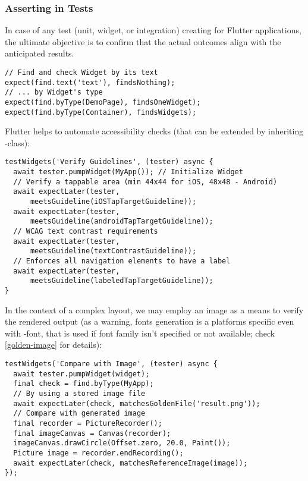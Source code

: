 \newpage
\subsubsection{Asserting in Tests}

In case of any test (unit, widget, or integration) creating for Flutter applications, the ultimate objective is to 
confirm that the actual outcomes align with the anticipated results.

\begin{lstlisting}
// Find and check Widget by its text
expect(find.text('text'), findsNothing);
// ... by Widget's type
expect(find.byType(DemoPage), findsOneWidget);
expect(find.byType(Container), findsWidgets);
\end{lstlisting}

\noindent Flutter helps to automate accessibility checks (that can be extended by inheriting 
-class):

\begin{lstlisting}
testWidgets('Verify Guidelines', (tester) async {
  await tester.pumpWidget(MyApp()); // Initialize Widget
  // Verify a tappable area (min 44x44 for iOS, 48x48 - Android)
  await expectLater(tester, 
      meetsGuideline(iOSTapTargetGuideline));
  await expectLater(tester, 
      meetsGuideline(androidTapTargetGuideline));
  // WCAG text contrast requirements
  await expectLater(tester, 
      meetsGuideline(textContrastGuideline));
  // Enforces all navigation elements to have a label
  await expectLater(tester,
      meetsGuideline(labeledTapTargetGuideline));
}
\end{lstlisting}

\noindent In the context of a complex layout, we may employ an image as a means to verify the rendered output (as a 
warning, fonts generation is a platforms specific even with -font, that is used if font family isn't 
specified or not available; check \ref{golden-image} for details):

\begin{lstlisting}
testWidgets('Compare with Image', (tester) async {
  await tester.pumpWidget(widget);
  final check = find.byType(MyApp);
  // By using a stored image file
  await expectLater(check, matchesGoldenFile('result.png'));
  // Compare with generated image
  final recorder = PictureRecorder();
  final imageCanvas = Canvas(recorder);
  imageCanvas.drawCircle(Offset.zero, 20.0, Paint());
  Picture image = recorder.endRecording();
  await expectLater(check, matchesReferenceImage(image));
});
\end{lstlisting}
